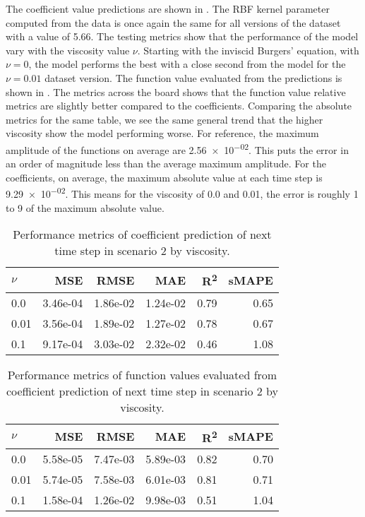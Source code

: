 The coefficient value predictions are shown in . The RBF kernel parameter computed from the data is once again the same for all versions of the dataset with a value of 5.66. The testing metrics show that the performance of the model vary with the viscosity value \(\nu \). Starting with the inviscid Burgers' equation, with \(\nu=0\), the model performs the best with a close second from the model for the \(\nu = 0.01 \) dataset version. The function value evaluated from the predictions is shown in . The metrics across the board shows that the function value relative metrics are slightly better compared to the coefficients. Comparing the absolute metrics for the same table, we see the same general trend that the higher viscosity show the model performing worse. For reference, the maximum amplitude of the functions on average are \num{2.56e-02}. This puts the error in an order of magnitude less than the average maximum amplitude. For the coefficients, on average, the maximum absolute value at each time step is \num{9.29e-02}. This means for the viscosity of 0.0 and \num{0.01}, the error is roughly 1 to 9 of the maximum absolute value.

\begin{table}[H]
  \caption{Performance metrics of coefficient prediction of next time step in scenario 2 by viscosity.}\label{table:scenario_2_spectral_metrics}
  \centering
  \begin{tabular}{lrrrrr}
    \toprule
    \(\nu \) & MSE      & RMSE     & MAE      & R\textsuperscript{2} & sMAPE \\
    \midrule
    0.0      & 3.46e-04 & 1.86e-02 & 1.24e-02 & 0.79                 & 0.65  \\
    0.01     & 3.56e-04 & 1.89e-02 & 1.27e-02 & 0.78                 & 0.67  \\
    0.1      & 9.17e-04 & 3.03e-02 & 2.32e-02 & 0.46                 & 1.08  \\
    \bottomrule
  \end{tabular}
\end{table}

\begin{table}[H]
  \caption{Performance metrics of function values evaluated from coefficient prediction of next time step in scenario 2 by viscosity.}\label{table:scenario_2_function_metrics}
  \centering
  \begin{tabular}{lrrrrr}
    \toprule
    \(\nu \) & MSE      & RMSE     & MAE      & R\textsuperscript{2} & sMAPE \\
    \midrule
    0.0      & 5.58e-05 & 7.47e-03 & 5.89e-03 & 0.82                 & 0.70  \\
    0.01     & 5.74e-05 & 7.58e-03 & 6.01e-03 & 0.81                 & 0.71  \\
    0.1      & 1.58e-04 & 1.26e-02 & 9.98e-03 & 0.51                 & 1.04  \\
    \bottomrule
  \end{tabular}
\end{table}

